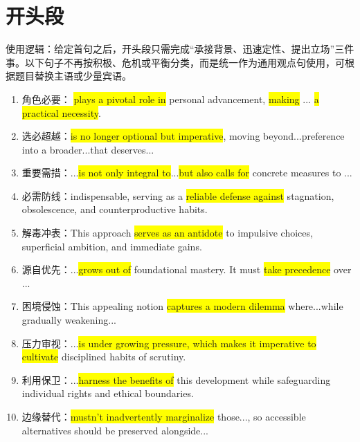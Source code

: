 ﻿\documentclass[lang=cn,11pt]{elegantbook}
\begin{document}
\section{开头段}

使用逻辑：给定首句之后，开头段只需完成“承接背景、迅速定性、提出立场”三件事。以下句子不再按积极、危机或平衡分类，而是统一作为通用观点句使用，可根据题目替换主语或少量宾语。

\begin{enumerate}
    \item 角色必要： \colorbox{yellow}{plays a pivotal role in} personal advancement, \colorbox{yellow}{making} ... \colorbox{yellow}{a practical necessity}.
    \item 选必超越：\colorbox{yellow}{is no longer optional but imperative}, moving beyond...preference into a broader...that deserves...
    \item 重要需措：...\colorbox{yellow}{is not only integral to}...\colorbox{yellow}{but also calls for} concrete measures to ...
    \item 必需防线：indispensable, serving as a \colorbox{yellow}{reliable defense against} stagnation, obsolescence, and counterproductive habits.
    \item 解毒冲表：This approach \colorbox{yellow}{serves as an antidote} to impulsive choices, superficial ambition, and immediate gains.
    \item 源自优先：...\colorbox{yellow}{grows out of} foundational mastery. It must \colorbox{yellow}{take precedence} over ...
    \item 困境侵蚀：This appealing notion \colorbox{yellow}{captures a modern dilemma} where...while gradually weakening...
    \item 压力审视：...\colorbox{yellow}{is under growing pressure, which makes it imperative to cultivate} disciplined habits of scrutiny.
    \item 利用保卫：...\colorbox{yellow}{harness the benefits of} this development while safeguarding individual rights and ethical boundaries.
    \item 边缘替代：\colorbox{yellow}{mustn't inadvertently marginalize} those..., so accessible alternatives should be preserved alongside...
\end{enumerate}
\end{document}

